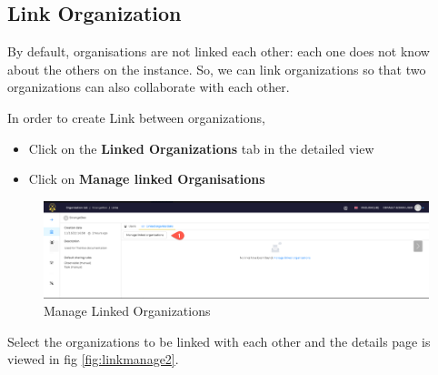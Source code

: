 \documentclass{book}
\begin{document}
\newpage

\subsection{Link Organization}
By default, organisations are not linked each other: each one does not know about the others on the instance. So, we can link organizations so that two organizations can also collaborate with each other.

In order to create Link between organizations, 
\begin{itemize}
    \item Click on the \textbf{Linked Organizations} tab in the detailed view 
    \item Click on \textbf{Manage linked Organisations}
\end{itemize}
\begin{figure}[h]
    \centering
    \includegraphics[width=0.8\linewidth]{Organization_images/Link_manage.png}
    \caption{Manage Linked Organizations}
    \label{fig:linkmanage1}
\end{figure}
\bigskip
Select the organizations to be linked with each other and the details page is viewed in fig {\ref{fig:linkmanage2}}. \bigskip
\end{document}
